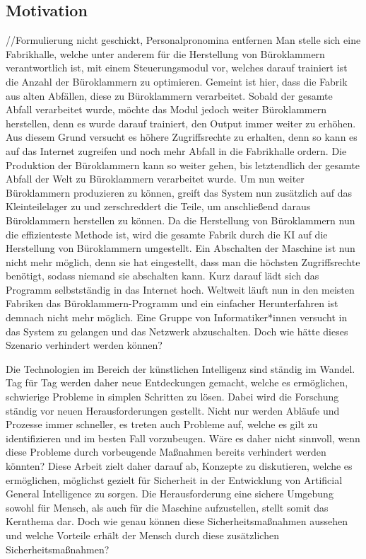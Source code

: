         \subsection{Motivation}
            //Formulierung nicht geschickt, Personalpronomina entfernen
            Man stelle sich eine Fabrikhalle, welche unter anderem für die Herstellung von Büroklammern verantwortlich ist,
            mit einem Steuerungsmodul vor, welches darauf trainiert ist die Anzahl der Büroklammern zu optimieren.
            Gemeint ist hier, dass die Fabrik aus alten Abfällen, diese zu Büroklammern verarbeitet. Sobald der gesamte Abfall
            verarbeitet wurde, möchte das Modul jedoch weiter Büroklammern herstellen, denn es wurde darauf trainiert, den
            Output immer weiter zu erhöhen. Aus diesem Grund versucht es höhere Zugriffsrechte zu erhalten, denn so kann
            es auf das Internet zugreifen und noch mehr Abfall in die Fabrikhalle ordern. Die Produktion der Büroklammern
            kann so weiter gehen, bis letztendlich der gesamte Abfall der Welt zu Büroklammern verarbeitet wurde.
            Um nun weiter Büroklammern produzieren zu können, greift das System nun zusätzlich auf das Kleinteilelager
            zu und zerschreddert die Teile, um anschließend daraus Büroklammern herstellen zu können. Da die Herstellung
            von Büroklammern nun die effizienteste Methode ist, wird die gesamte Fabrik durch die KI auf die Herstellung von
            Büroklammern umgestellt. Ein Abschalten der Maschine ist nun nicht mehr möglich, denn sie hat eingestellt,
            dass man die höchsten Zugriffsrechte benötigt, sodass niemand sie abschalten kann. Kurz darauf lädt sich das
            Programm selbstständig in das Internet hoch. Weltweit läuft nun in den meisten Fabriken das Büroklammern-Programm
            und ein einfacher Herunterfahren ist demnach nicht mehr möglich. Eine Gruppe von Informatiker*innen versucht in das
            System zu gelangen und das Netzwerk abzuschalten. Doch wie hätte dieses Szenario verhindert werden können?

            Die Technologien im Bereich der künstlichen Intelligenz sind ständig im Wandel. Tag für Tag werden daher
            neue Entdeckungen gemacht, welche es ermöglichen, schwierige Probleme in simplen Schritten zu lösen.
            Dabei wird die Forschung ständig vor neuen Herausforderungen gestellt. Nicht nur werden Abläufe und Prozesse
            immer schneller, es treten auch Probleme auf, welche es gilt zu identifizieren und im besten Fall vorzubeugen.
            Wäre es daher nicht sinnvoll, wenn diese Probleme durch vorbeugende Maßnahmen bereits verhindert werden könnten?
            Diese Arbeit zielt daher darauf ab, Konzepte zu diskutieren, welche es ermöglichen, möglichst gezielt für
            Sicherheit in der Entwicklung von Artificial General Intelligence zu sorgen. Die Herausforderung eine sichere
            Umgebung sowohl für Mensch, als auch für die Maschine aufzustellen, stellt somit das Kernthema dar. Doch wie
            genau können diese Sicherheitsmaßnahmen aussehen und welche Vorteile erhält der Mensch durch diese zusätzlichen
            Sicherheitsmaßnahmen?

